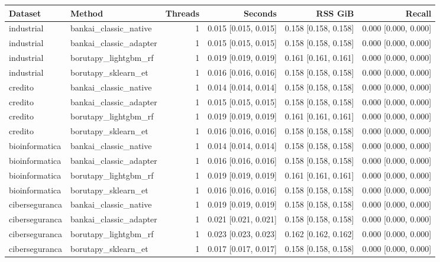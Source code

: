 \begin{tabular}{llrrrr}
Dataset & Method & Threads & Seconds & RSS GiB & Recall \\
\hline
industrial & bankai\_classic\_native & 1 & 0.015 [0.015, 0.015] & 0.158 [0.158, 0.158] & 0.000 [0.000, 0.000] \\
industrial & bankai\_classic\_adapter & 1 & 0.015 [0.015, 0.015] & 0.158 [0.158, 0.158] & 0.000 [0.000, 0.000] \\
industrial & borutapy\_lightgbm\_rf & 1 & 0.019 [0.019, 0.019] & 0.161 [0.161, 0.161] & 0.000 [0.000, 0.000] \\
industrial & borutapy\_sklearn\_et & 1 & 0.016 [0.016, 0.016] & 0.158 [0.158, 0.158] & 0.000 [0.000, 0.000] \\
credito & bankai\_classic\_native & 1 & 0.014 [0.014, 0.014] & 0.158 [0.158, 0.158] & 0.000 [0.000, 0.000] \\
credito & bankai\_classic\_adapter & 1 & 0.015 [0.015, 0.015] & 0.158 [0.158, 0.158] & 0.000 [0.000, 0.000] \\
credito & borutapy\_lightgbm\_rf & 1 & 0.019 [0.019, 0.019] & 0.161 [0.161, 0.161] & 0.000 [0.000, 0.000] \\
credito & borutapy\_sklearn\_et & 1 & 0.016 [0.016, 0.016] & 0.158 [0.158, 0.158] & 0.000 [0.000, 0.000] \\
bioinformatica & bankai\_classic\_native & 1 & 0.014 [0.014, 0.014] & 0.158 [0.158, 0.158] & 0.000 [0.000, 0.000] \\
bioinformatica & bankai\_classic\_adapter & 1 & 0.016 [0.016, 0.016] & 0.158 [0.158, 0.158] & 0.000 [0.000, 0.000] \\
bioinformatica & borutapy\_lightgbm\_rf & 1 & 0.019 [0.019, 0.019] & 0.161 [0.161, 0.161] & 0.000 [0.000, 0.000] \\
bioinformatica & borutapy\_sklearn\_et & 1 & 0.016 [0.016, 0.016] & 0.158 [0.158, 0.158] & 0.000 [0.000, 0.000] \\
ciberseguranca & bankai\_classic\_native & 1 & 0.019 [0.019, 0.019] & 0.158 [0.158, 0.158] & 0.000 [0.000, 0.000] \\
ciberseguranca & bankai\_classic\_adapter & 1 & 0.021 [0.021, 0.021] & 0.158 [0.158, 0.158] & 0.000 [0.000, 0.000] \\
ciberseguranca & borutapy\_lightgbm\_rf & 1 & 0.023 [0.023, 0.023] & 0.162 [0.162, 0.162] & 0.000 [0.000, 0.000] \\
ciberseguranca & borutapy\_sklearn\_et & 1 & 0.017 [0.017, 0.017] & 0.158 [0.158, 0.158] & 0.000 [0.000, 0.000] \\
\end{tabular}
